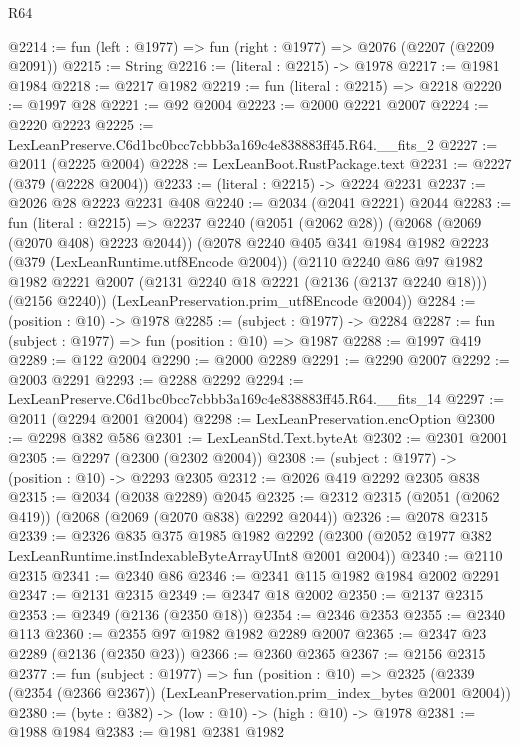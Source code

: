 \begin{lexlean}{R64}
\begin{coremodule}
@2214 := fun (left : @1977) => fun (right : @1977) => @2076 (@2207 (@2209 @2091))
@2215 := String
@2216 := (literal : @2215) -> @1978
@2217 := @1981 @1984
@2218 := @2217 @1982
@2219 := fun (literal : @2215) => @2218
@2220 := @1997 @28
@2221 := @92 @2004
@2223 := @2000 @2221 @2007
@2224 := @2220 @2223
@2225 := LexLeanPreserve.C6d1bc0bcc7cbbb3a169c4e838883ff45.R64.__fits_2
@2227 := @2011 (@2225 @2004)
@2228 := LexLeanBoot.RustPackage.text
@2231 := @2227 (@379 (@2228 @2004))
@2233 := (literal : @2215) -> @2224 @2231
@2237 := @2026 @28 @2223 @2231 @408
@2240 := @2034 (@2041 @2221) @2044
@2283 := fun (literal : @2215) =>
  @2237
    @2240
    (@2051 (@2062 @28))
    (@2068 (@2069 (@2070 @408) @2223 @2044))
    (@2078
      @2240
      @405
      @341
      @1984
      @1982
      @2223
      (@379 (LexLeanRuntime.utf8Encode @2004))
      (@2110
        @2240
        @86
        @97
        @1982
        @1982
        @2221
        @2007
        (@2131 @2240 @18 @2221 (@2136 (@2137 @2240 @18)))
        (@2156 @2240))
      (LexLeanPreservation.prim_utf8Encode @2004))
@2284 := (position : @10) -> @1978
@2285 := (subject : @1977) -> @2284
@2287 := fun (subject : @1977) => fun (position : @10) => @1987
@2288 := @1997 @419
@2289 := @122 @2004
@2290 := @2000 @2289
@2291 := @2290 @2007
@2292 := @2003 @2291
@2293 := @2288 @2292
@2294 := LexLeanPreserve.C6d1bc0bcc7cbbb3a169c4e838883ff45.R64.__fits_14
@2297 := @2011 (@2294 @2001 @2004)
@2298 := LexLeanPreservation.encOption
@2300 := @2298 @382 @586
@2301 := LexLeanStd.Text.byteAt
@2302 := @2301 @2001
@2305 := @2297 (@2300 (@2302 @2004))
@2308 := (subject : @1977) -> (position : @10) -> @2293 @2305
@2312 := @2026 @419 @2292 @2305 @838
@2315 := @2034 (@2038 @2289) @2045
@2325 := @2312 @2315 (@2051 (@2062 @419)) (@2068 (@2069 (@2070 @838) @2292 @2044))
@2326 := @2078 @2315
@2339 := @2326
    @835
    @375
    @1985
    @1982
    @2292
    (@2300 (@2052 @1977 @382 LexLeanRuntime.instIndexableByteArrayUInt8 @2001 @2004))
@2340 := @2110 @2315
@2341 := @2340 @86
@2346 := @2341 @115 @1982 @1984 @2002 @2291
@2347 := @2131 @2315
@2349 := @2347 @18 @2002
@2350 := @2137 @2315
@2353 := @2349 (@2136 (@2350 @18))
@2354 := @2346 @2353
@2355 := @2340 @113
@2360 := @2355 @97 @1982 @1982 @2289 @2007
@2365 := @2347 @23 @2289 (@2136 (@2350 @23))
@2366 := @2360 @2365
@2367 := @2156 @2315
@2377 := fun (subject : @1977) =>
  fun (position : @10) =>
  @2325 (@2339 (@2354 (@2366 @2367)) (LexLeanPreservation.prim_index_bytes @2001 @2004))
@2380 := (byte : @382) -> (low : @10) -> (high : @10) -> @1978
@2381 := @1988 @1984
@2383 := @1981 @2381 @1982

\end{coremodule}
\end{lexlean}
